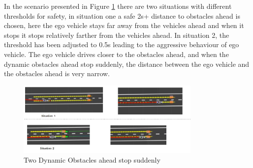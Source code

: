 In the scenario presented in Figure \ref{dynamic_2} there are two situations with different thresholds for safety, in situation one a safe 2s+ distance to obstacles ahead is chosen, here the ego vehicle stays far away from the vehicles ahead and when it stops it stops relatively farther from the vehicles ahead. In situation 2, the threshold has been adjusted to 0.5s leading to the aggressive behaviour of ego vehicle. The ego vehicle drives closer to the obstacles ahead, and when the dynamic obstacles ahead stop suddenly, the distance between the ego vehicle and the obstacles ahead is very narrow.   
\begin{figure}[h]
    \centering
    \includegraphics[width=0.8\textwidth]{Images/evaluation/dynamic_ahead_breaking2.jpg}
    \caption{Two Dynamic Obstacles ahead stop suddenly}
    \label{dynamic_2}
\end{figure}

